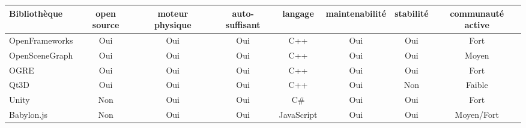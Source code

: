\newpage
\begin{landscape}
\hspace{-2cm} 
\begin{tabular}{l|c|c|c|c|c|c|c}
Bibliothèque & open source & moteur physique & auto-suffisant & langage & maintenabilité & stabilité & communauté active\\
\hline
OpenFrameworks & Oui & Oui & Oui & C++ & Oui & Oui & Fort\\
OpenSceneGraph & Oui & Oui & Oui & C++ & Oui & Oui & Moyen\\ 
OGRE & Oui & Oui & Oui & C++ & Oui & Oui & Fort\\
Qt3D & Oui & Oui & Oui & C++ & Oui & Non & Faible\\
Unity & Non & Oui & Oui & C\# & Oui & Oui & Fort\\
Babylon.js  & Non & Oui & Oui & JavaScript & Oui & Oui & Moyen/Fort\\
\end{tabular}
\end{landscape}
